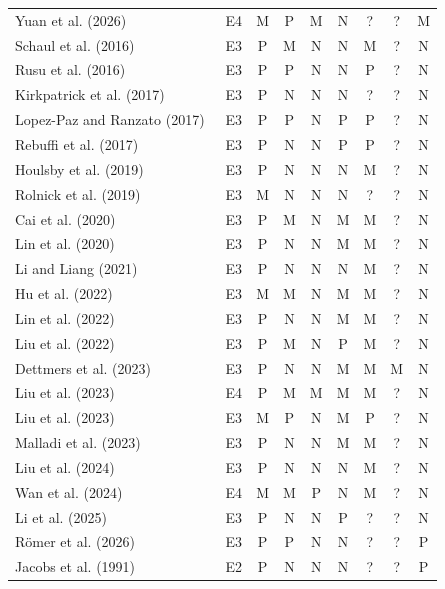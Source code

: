 \documentclass[10pt,a4paper]{article}
\begin{document}
\begin{longtable}{@{}>{\raggedright\arraybackslash}p{5.5cm}cccccccc@{}}
Yuan et al. (2026)~\cite{Yuan2026} & E4 & M & P & M & N & ? & ? & M \\
Schaul et al. (2016)~\cite{Schaul2016} & E3 & P & M & N & N & M & ? & N \\
Rusu et al. (2016)~\cite{Rusu2016} & E3 & P & P & N & N & P & ? & N \\
Kirkpatrick et al. (2017)~\cite{Kirkpatrick2017} & E3 & P & N & N & N & ? & ? & N \\
Lopez-Paz and Ranzato (2017)~\cite{LopezPaz2017} & E3 & P & P & N & P & P & ? & N \\
Rebuffi et al. (2017)~\cite{Rebuffi2017} & E3 & P & N & N & P & P & ? & N \\
Houlsby et al. (2019)~\cite{Houlsby2019} & E3 & P & N & N & N & M & ? & N \\
Rolnick et al. (2019)~\cite{Rolnick2019} & E3 & M & N & N & N & ? & ? & N \\
Cai et al. (2020)~\cite{Cai2020} & E3 & P & M & N & M & M & ? & N \\
Lin et al. (2020)~\cite{Lin2020} & E3 & P & N & N & M & M & ? & N \\
Li and Liang (2021)~\cite{Li2021} & E3 & P & N & N & N & M & ? & N \\
Hu et al. (2022)~\cite{Hu2022} & E3 & M & M & N & M & M & ? & N \\
Lin et al. (2022)~\cite{Lin2022} & E3 & P & N & N & M & M & ? & N \\
Liu et al. (2022)~\cite{Liu2022} & E3 & P & M & N & P & M & ? & N \\
Dettmers et al. (2023)~\cite{Dettmers2023} & E3 & P & N & N & M & M & M & N \\
Liu et al. (2023)~\cite{Liu2023} & E4 & P & M & M & M & M & ? & N \\
Liu et al. (2023)~\cite{Liu2023b} & E3 & M & P & N & M & P & ? & N \\
Malladi et al. (2023)~\cite{Malladi2023} & E3 & P & N & N & M & M & ? & N \\
Liu et al. (2024)~\cite{Liu2024b} & E3 & P & N & N & N & M & ? & N \\
Wan et al. (2024)~\cite{Wan2024} & E4 & M & M & P & N & M & ? & N \\
Li et al. (2025)~\cite{Li2025} & E3 & P & N & N & P & ? & ? & N \\
R\"omer et al. (2026)~\cite{Romer2026b} & E3 & P & P & N & N & ? & ? & P \\
Jacobs et al. (1991)~\cite{Jacobs1991} & E2 & P & N & N & N & ? & ? & P \\

\end{longtable}
\end{document}
